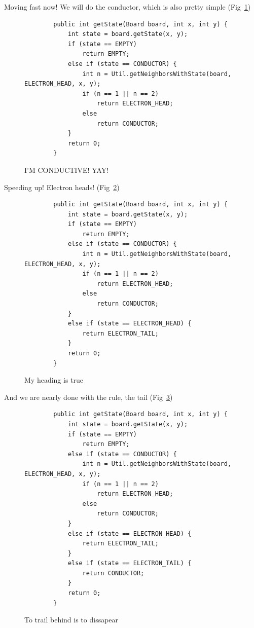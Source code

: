 \documentclass{report}
\begin{document}
Moving fast now! We will do the conductor, which is also pretty simple
(Fig~\ref{code:conductor}) 
\begin{figure}[H]
\begin{lstlisting}
        public int getState(Board board, int x, int y) {
        	int state = board.getState(x, y);
        	if (state == EMPTY)
        		return EMPTY;
        	else if (state == CONDUCTOR) {
        		int n = Util.getNeighborsWithState(board, ELECTRON_HEAD, x, y);
        		if (n == 1 || n == 2)
        			return ELECTRON_HEAD;
        		else
        			return CONDUCTOR;
        	}
        	return 0;
        }
\end{lstlisting}
\caption{I'M CONDUCTIVE! YAY!}
\label{code:conductor}
\end{figure}


Speeding up! Electron heads! (Fig~\ref{code:elHead})
\begin{figure}[H]
\begin{lstlisting}
        public int getState(Board board, int x, int y) {
        	int state = board.getState(x, y);
        	if (state == EMPTY)
        		return EMPTY;
        	else if (state == CONDUCTOR) {
        		int n = Util.getNeighborsWithState(board, ELECTRON_HEAD, x, y);
        		if (n == 1 || n == 2)
        			return ELECTRON_HEAD;
        		else
        			return CONDUCTOR;
        	}
        	else if (state == ELECTRON_HEAD) {
        		return ELECTRON_TAIL;
        	}
        	return 0;
        }
\end{lstlisting}
\caption{My heading is true}
\label{code:elHead}
\end{figure}

And we are nearly done with the rule, the tail (Fig~\ref{code:elTail})
\begin{figure}[H]
\begin{lstlisting}
        public int getState(Board board, int x, int y) {
        	int state = board.getState(x, y);
        	if (state == EMPTY)
        		return EMPTY;
        	else if (state == CONDUCTOR) {
        		int n = Util.getNeighborsWithState(board, ELECTRON_HEAD, x, y);
        		if (n == 1 || n == 2)
        			return ELECTRON_HEAD;
        		else
        			return CONDUCTOR;
        	}
        	else if (state == ELECTRON_HEAD) {
        		return ELECTRON_TAIL;
        	}
        	else if (state == ELECTRON_TAIL) {
        		return CONDUCTOR;
        	}
        	return 0;
        }
\end{lstlisting}
\caption{To trail behind is to dissapear}
\label{code:elTail}
\end{figure}
\end{document}
